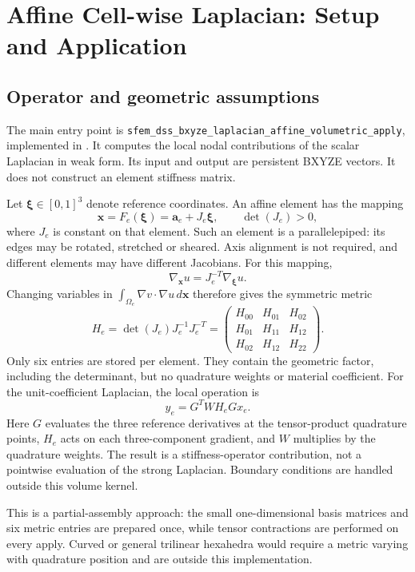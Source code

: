 \documentclass[11pt]{article}
\begin{document}
\FloatBarrier
\section{Affine Cell-wise Laplacian: Setup and Application}
\label{sec:affine-laplacian}

\subsection{Operator and geometric assumptions}

The main entry point is
\texttt{sfem\_dss\_bxyze\_laplacian\_affine\_volumetric\_apply},
implemented in .
It computes the local nodal contributions of the scalar Laplacian in weak form.
Its input and output are persistent BXYZE vectors. It does not construct an
element stiffness matrix.

Let \(\boldsymbol{\xi}\in[0,1]^3\) denote reference coordinates. An affine
element has the mapping
\[
 \boldsymbol{x}=F_e(\boldsymbol{\xi})
 =\boldsymbol{a}_e+J_e\boldsymbol{\xi},
 \qquad \det(J_e)>0,
\]
where \(J_e\) is constant on that element. Such an element is a
parallelepiped: its edges may be rotated, stretched or sheared. Axis alignment
is not required, and different elements may have different Jacobians.
For this mapping,
\[
 \nabla_{\boldsymbol{x}}u=J_e^{-T}\nabla_{\boldsymbol{\xi}}u.
\]
Changing variables in
\(\int_{\Omega_e}\nabla v\cdot\nabla u\,d\boldsymbol{x}\)
therefore gives the symmetric metric
\[
 H_e=\det(J_e)J_e^{-1}J_e^{-T}
 =\begin{pmatrix}
 H_{00}&H_{01}&H_{02}\\
 H_{01}&H_{11}&H_{12}\\
 H_{02}&H_{12}&H_{22}
 \end{pmatrix}.
\]
Only six entries are stored per element. They contain the geometric factor,
including the determinant, but no quadrature weights or material coefficient.
For the unit-coefficient Laplacian, the local operation is
\[
 \boxed{\quad y_e=G^TWH_eGx_e.\quad}
\]
Here \(G\) evaluates the three reference derivatives at the tensor-product
quadrature points, \(H_e\) acts on each three-component gradient, and \(W\)
multiplies by the quadrature weights. The result is a stiffness-operator
contribution, not a pointwise evaluation of the strong Laplacian.
Boundary conditions are handled outside this volume kernel.

This is a partial-assembly approach: the small one-dimensional basis matrices
and six metric entries are prepared once, while tensor contractions are
performed on every apply. Curved or general trilinear hexahedra would require
a metric varying with quadrature position and are outside this implementation.
\end{document}
